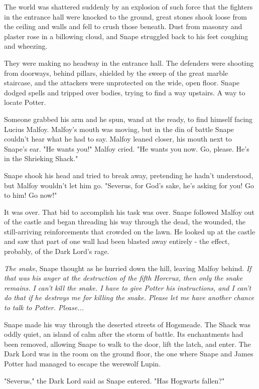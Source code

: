 The world was shattered suddenly by an explosion of such force that the fighters in the entrance hall were knocked to the ground, great stones shook loose from the ceiling and walls and fell to crush those beneath. Dust from masonry and plaster rose in a billowing cloud, and Snape struggled back to his feet coughing and wheezing.

They were making no headway in the entrance hall. The defenders were shooting from doorways, behind pillars, shielded by the sweep of the great marble staircase, and the attackers were unprotected on the wide, open floor. Snape dodged spells and tripped over bodies, trying to find a way upstairs. A way to locate Potter.

Someone grabbed his arm and he spun, wand at the ready, to find himself facing Lucius Malfoy. Malfoy's mouth was moving, but in the din of battle Snape couldn't hear what he had to say. Malfoy leaned closer, his mouth next to Snape's ear. "He wants you!" Malfoy cried. "He wants you now. Go, please. He's in the Shrieking Shack."

Snape shook his head and tried to break away, pretending he hadn't understood, but Malfoy wouldn't let him go. "Severus, for God's sake, he's asking for you! Go to him! Go now!"

It was over. That bid to accomplish his task was over. Snape followed Malfoy out of the castle and began threading his way through the dead, the wounded, the still-arriving reinforcements that crowded on the lawn. He looked up at the castle and saw that part of one wall had been blasted away entirely - the effect, probably, of the Dark Lord's rage.

\emph{The snake}, Snape thought as he hurried down the hill, leaving Malfoy behind. \emph{If that was his anger at the destruction of the fifth Horcrux, then only the snake remains. I can't kill the snake. I have to give Potter his instructions, and I can't do that if he destroys me for killing the snake. Please let me have another chance to talk to Potter. Please...}

Snape made his way through the deserted streets of Hogsmeade. The Shack was oddly quiet, an island of calm after the storm of battle. Its enchantments had been removed, allowing Snape to walk to the door, lift the latch, and enter. The Dark Lord was in the room on the ground floor, the one where Snape and James Potter had managed to escape the werewolf Lupin.

"Severus," the Dark Lord said as Snape entered. "Has Hogwarts fallen?"


